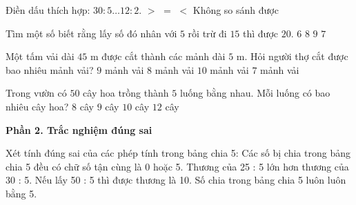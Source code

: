 \begin{ex} %
Điền dấu thích hợp: $30 : 5 \dots 12 : 2$.
\choice
{$>$}
{\True $=$}
{$<$}
{Không so sánh được}
\end{ex}

\begin{ex} %
Tìm một số biết rằng lấy số đó nhân với $5$ rồi trừ đi $15$ thì được $20$.
\choice
{$6$}
{$8$}
{$9$}
{\True $7$}
\end{ex}

\begin{ex} %
Một tấm vải dài $45\text{ m}$ được cắt thành các mảnh dài $5\text{ m}$. Hỏi người thợ cắt được bao nhiêu mảnh vải?
\choice
{\True $9$ mảnh vải}
{$8$ mảnh vải}
{$10$ mảnh vải}
{$7$ mảnh vải}
\end{ex}

\begin{ex} %
Trong vườn có $50$ cây hoa trồng thành $5$ luống bằng nhau. Mỗi luống có bao nhiêu cây hoa?
\choice
{$8$ cây}
{$9$ cây}
{\True $10$ cây}
{$12$ cây}
\end{ex}

\textbf{Phần 2. Trắc nghiệm đúng sai}

\begin{ex} %
Xét tính đúng sai của các phép tính trong bảng chia 5:
\choiceTF
{\True Các số bị chia trong bảng chia 5 đều có chữ số tận cùng là 0 hoặc 5.}
{Thương của 25 : 5 lớn hơn thương của 30 : 5.}
{\True Nếu lấy 50 : 5 thì được thương là 10.}
{\True Số chia trong bảng chia 5 luôn luôn bằng 5.}
\end{ex}

